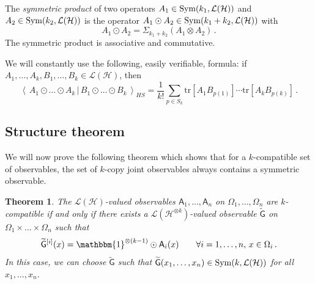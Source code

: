 \documentclass[12pt]{amsart}
\newtheorem{theorem}{Theorem}
\theoremstyle{definition}
\newcommand{\hh}{\mathcal{H}} %
\newcommand{\lh}{\mathcal{L(H)}} %
\newcommand{\elle}[1]{\mathcal{L}(#1)} %
\newcommand{\ip}[2]{\left\langle\,#1\,|\,#2\,\right\rangle} %
\newcommand{\tr}[1]{\mathrm{tr}\left[#1\right]} %
\newcommand{\id}{\mathbbm{1}} %
\newcommand{\A}{\mathsf{A}}%
\newcommand{\G}{\mathsf{G}}%
\newcommand{\tA}{A}
\newcommand{\Sym}{{\rm Sym}}
\begin{document}
The {\em symmetric product} of two operators $\tA_1\in\Sym(k_1,\lh)$ and $\tA_2\in\Sym(k_2,\lh)$ is the operator $\tA_1\odot\tA_2\in\Sym(k_1+k_2,\lh)$ with
$$
\tA_1\odot\tA_2 = \Sigma_{k_1+k_2}(\tA_1\otimes\tA_2)\,.
$$
The symmetric product is associative and commutative. 

We will constantly use the following, easily verifiable, formula:
if $A_1,\ldots,A_k,B_1,\ldots,B_k\in\lh$, then
$$
\ip{A_1\odot\ldots\odot A_k}{B_1\odot\ldots\odot B_k}_{HS} = \frac{1}{k!} \sum_{p\in S_k} \tr{A_1 B_{p(1)}}\cdots\tr{A_k B_{p(k)}} \,.
$$

\subsection{Structure theorem}
We will now prove the following theorem which shows that for a $k$-compatible set of observables, the set of $k$-copy joint observables always contains a symmetric observable.

\begin{theorem}\label{prop:k-comp}
The $\lh$-valued observables $\A_1,\ldots,\A_n$ on $\Omega_1,\ldots,\Omega_n$ are $k$-compatible if and only if there exists a $\elle{\hh^{\otimes k}}$-valued observable $\widetilde{\G}$ on $\Omega_1\times\ldots\times\Omega_n$ such that
\begin{equation}\label{eq:joint-2}
\widetilde{\G}^{[i]}(x) = \id^{\otimes (k-1)}\odot\A_i(x) \qquad \forall i=1,\ldots,n,\, x\in\Omega_i \, .
\end{equation}
In this case, we can choose $\widetilde{\G}$ such that $\widetilde{\G}(x_1,\ldots,x_n)\in\Sym(k,\lh)$ for all $x_1,\ldots,x_n$.
\end{theorem}
\end{document}
